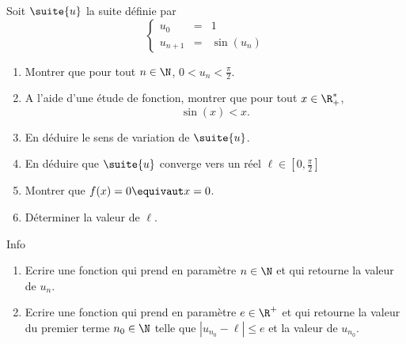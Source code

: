 \documentclass[a4paper, 11pt,reqno]{article}
\begin{document}
\begin{exercice}
Soit $\suite{u}$ la suite définie par 
$$\left\{ 
\begin{array}{ccl}
u_0&=&1\\
u_{n+1} &=& \sin(u_n)
\end{array}
\right.$$

\begin{enumerate}
\item Montrer que pour tout $n\in \N$, $0<u_n<\frac{\pi}{2}$.
\item  A l'aide d'une étude de fonction, montrer que pour tout $x\in \R_+^*$, $$\sin(x)<x.$$
\item En déduire le sens de variation de $\suite{u}$.
\item En déduire que $\suite{u}$ converge vers un réel $\ell\in [0,\frac{\pi}{2}]$
\item  Montrer que $f(x)=0 \equivaut x=0$.
\item Déterminer la valeur de $\ell$. 
\end{enumerate}

Info 
\begin{enumerate}
\item Ecrire une fonction qui prend en paramètre $n\in \N$ et qui retourne la valeur de $u_n$. 
\item 
Ecrire une fonction qui prend en paramètre $e\in \R^+$ et qui retourne la valeur du premier terme $n_0\in \N$ telle que $|u_{n_0}-\ell| \leq e$ et la valeur de $u_{n_0}$.
\end{enumerate}

\end{exercice}
\end{document}

